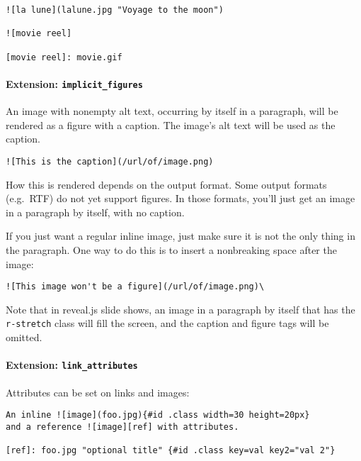 \documentclass[
]{article}
\begin{document}
\begin{verbatim}
![la lune](lalune.jpg "Voyage to the moon")

![movie reel]

[movie reel]: movie.gif
\end{verbatim}

\paragraph{\texorpdfstring{Extension:
\texttt{implicit\_figures}}{Extension: implicit\_figures}}\label{extension-implicit_figures}

An image with nonempty alt text, occurring by itself in a paragraph,
will be rendered as a figure with a caption. The image's alt text will
be used as the caption.

\begin{verbatim}
![This is the caption](/url/of/image.png)
\end{verbatim}

How this is rendered depends on the output format. Some output formats
(e.g.~RTF) do not yet support figures. In those formats, you'll just get
an image in a paragraph by itself, with no caption.

If you just want a regular inline image, just make sure it is not the
only thing in the paragraph. One way to do this is to insert a
nonbreaking space after the image:

\begin{verbatim}
![This image won't be a figure](/url/of/image.png)\
\end{verbatim}

Note that in reveal.js slide shows, an image in a paragraph by itself
that has the \texttt{r-stretch} class will fill the screen, and the
caption and figure tags will be omitted.

\paragraph{\texorpdfstring{Extension:
\texttt{link\_attributes}}{Extension: link\_attributes}}\label{extension-link_attributes}

Attributes can be set on links and images:

\begin{verbatim}
An inline ![image](foo.jpg){#id .class width=30 height=20px}
and a reference ![image][ref] with attributes.

[ref]: foo.jpg "optional title" {#id .class key=val key2="val 2"}
\end{verbatim}
\end{document}
